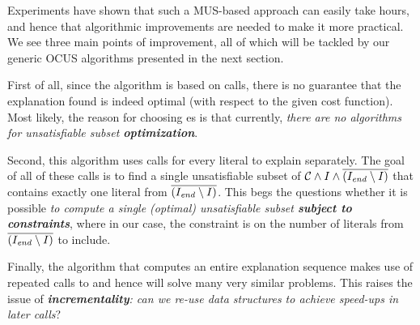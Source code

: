 Experiments have shown that such a MUS-based approach can easily take hours, and hence that algorithmic improvements are needed to make it more practical. 
We see three main points of improvement, all of which will be tackled by our generic OCUS algorithms presented in the next section. 
\begin{inparaenum}
 \item First of all, since the algorithm is based on  calls, there is no guarantee that the explanation found is indeed optimal %
 (with respect to the given cost function). 
 Most likely, the reason for choosing es is that currently, \textit{there are no algorithms for unsatisfiable subset \textbf{optimization}}. 
 \item Second, this algorithm uses  calls for every literal to explain separately. The goal of all of these calls is to find a single unsatisfiable subset of $\mathcal{C}  \land I \land \overline{(I_\mathit{end} \setminus I)}$ that contains exactly one literal from $\overline{(I_\mathit{end} \setminus I)}$. This begs the questions whether it is possible \textit{to compute a single (optimal) unsatisfiable subset \textbf{subject to constraints}}, where in our case, the constraint is on the number of literals from $\overline{(I_\mathit{end} \setminus I)}$ to include. 
 \item Finally, the algorithm that computes an entire explanation sequence makes use of repeated calls to \onestep and hence will solve many very similar problems. This raises the issue of \textit{\textbf{incrementality}: can we re-use data structures to achieve speed-ups in later calls}? 
\end{inparaenum}




